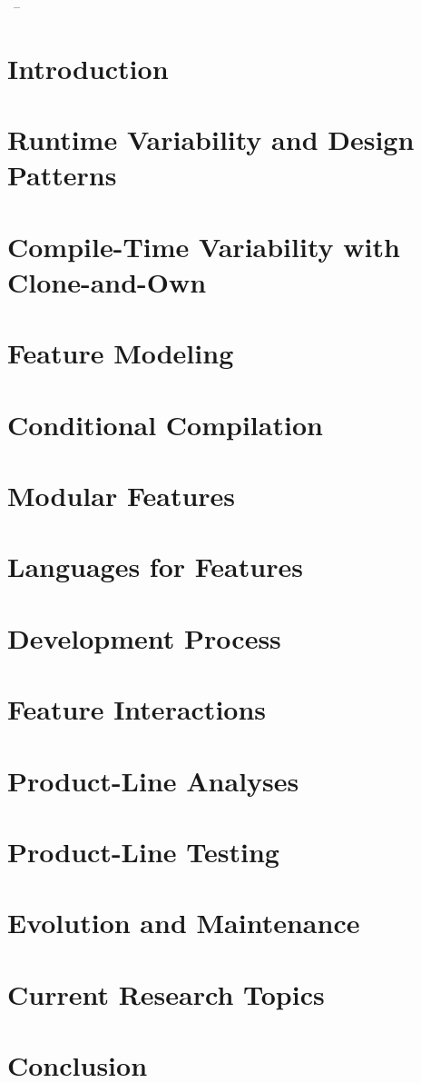 \documentclass[
	aspectratio=169, %
	8pt, %
	handout, %
]{beamer}
\subtitle{Lecture Topics}
\author{Thomas Thüm, Timo Kehrer, Elias Kuiter}
\newcommand{\addlecture}[2]{\section{#2}\begin{frame}\end{frame}}
\begin{document}
	
\begin{frame}{\inserttitle\ -- \insertsubtitle}
	\lectureseriesoverview
\end{frame}

\contentoverview
\usebackgroundtemplate{}
\AtBeginSection[]{}

\addlecture{01-introduction}{Introduction}
\addlecture{02-runtime}{Runtime Variability and Design Patterns}
\addlecture{03-cloneandown}{Compile-Time Variability with Clone-and-Own}
\sectionend

\addlecture{04-modeling}{Feature Modeling}
\addlecture{05-conditional}{Conditional Compilation}
\addlecture{06-modular}{Modular Features}
\addlecture{07-languages}{Languages for Features}
\addlecture{08-process}{Development Process}
\sectionend

\addlecture{09-interactions}{Feature Interactions}
\addlecture{10-analyses}{Product-Line Analyses}
\addlecture{11-testing}{Product-Line Testing}
\addlecture{12-evonance}{Evolution and Maintenance}
\sectionend

\addlecture{13-advanced}{Current Research Topics} %
\addlecture{14-conclusion}{Conclusion} %
\end{document}
